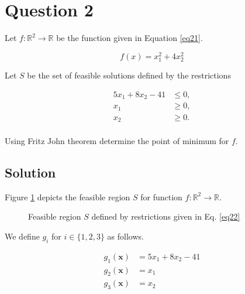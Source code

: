 \section*{Question 2}

Let $f : \mathbb{R}^2 \rightarrow \mathbb{R}$ be the function given in Equation \ref{eq21}.

\begin{equation}
f(x) = x_1^2 + 4x_2^2
\label{eq21}
\end{equation}

Let $S$ be the set of feasible solutions defined by the restrictions

\begin{equation}
\begin{aligned}
5x_1 + 8x_2 - 41 &\leqslant 0,\\
x_1 &\geqslant 0,\\
x_2 &\geqslant 0.\\
\end{aligned}
\label{eq22}
\end{equation}

Using Fritz John theorem determine the point of minimum for $f$.

\subsection*{Solution}

Figure \ref{fig21} depicts the feasible region $S$ for function $f: \mathbb{R}^2 \rightarrow \mathbb{R}$.

\begin{figure}[H]\centering
{}
\caption{Feasible region $S$ defined by restrictions given in Eq. \ref{eq22}}\label{fig21}
\end{figure}

We define $g_i$ for $i \in \{1,2,3\}$ as follows.

\begin{equation}
\begin{aligned}
g_1(\mathbf{x}) &= 5x_1 + 8x_2 - 41\\
g_2(\mathbf{x}) &= x_1\\
g_3(\mathbf{x}) &= x_2\\
\end{aligned}
\label{eq23}
\end{equation}


